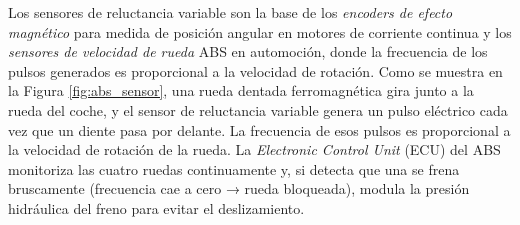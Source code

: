 Los sensores de reluctancia variable son la base de los \emph{encoders de efecto magnético} para medida de posición angular en motores de corriente continua y los \emph{sensores de velocidad de rueda}  ABS en automoción, donde la frecuencia de los pulsos generados es proporcional a la velocidad de rotación.  Como se muestra en la Figura \ref{fig:abs_sensor}, una rueda dentada ferromagnética gira junto a la rueda del coche, y el sensor de reluctancia variable genera un pulso eléctrico cada vez que un diente pasa por delante. La frecuencia de esos pulsos es proporcional a la velocidad de rotación de la rueda. La \emph{Electronic Control Unit} (ECU) del ABS monitoriza las cuatro ruedas continuamente y, si detecta que una se frena bruscamente (frecuencia cae a cero → rueda bloqueada), modula la presión hidráulica del freno para evitar el deslizamiento.







